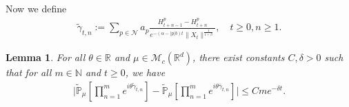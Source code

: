 \documentclass[12pt,a4paper]{amsart}
\theoremstyle{plain}
\newtheorem{lem}[thm]{Lemma}
\theoremstyle{definition}
\numberwithin{equation}{section}
\begin{document}
    Now we define
\begin{align}
    \tilde{\gamma}_{t,n}
    :=\sum_{p\in \mathcal{N}}a_p\frac{H^p_{t+n-1}-H^p_{t+n}}{e^{-(\alpha-|p|b)t}\|X_{t}\|^{\frac{1}{1+\beta}}},
    \quad t\geq 0, n\geq 1.
\end{align}
\begin{lem}\label{lem: lemma04}
    For all $\theta\in \mathbb{R}$ and $\mu\in \mathcal{M}_c(\mathbb{R}^d)$, there exist constants $C,\delta>0$ such that for all $m\in \mathbb{N}$ and $t\geq 0$, we have
\begin{align}
    \Big|\tilde{\mathbb{P}}_{\mu}[\prod_{n=1}^m e^{i\theta \tilde{\gamma}_{t,n}}]-\tilde{\mathbb{P}}_{\mu}[\prod_{n=1}^me^{i\theta \bar{\gamma}_{t,n}}]\Big|
    \leq C m e^{-\delta t}.
\end{align}
\end{lem}
\end{document}
